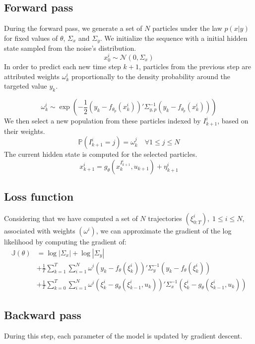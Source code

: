 \documentclass[10pt,a4paper]{article}
\begin{document}
\subsection{Forward pass}
During the forward pass, we generate a set of $N$ particles under the law $p(x|y)$ for fixed values of $\theta$, $\Sigma_x$ and $\Sigma_y$.
We initialize the sequence with a initial hidden state sampled from the noise's distribution.
$$
        x^i_0 \sim \mathcal{N}(0, \Sigma_x)
$$
In order to predict each new time step $k+1$, particles from the previous step are attributed weights $\omega_k^i$ proportionally to the density probability around the targeted value $y_k$.

$$\omega_k^i \sim \exp(-\frac{1}{2}(y_k - f_{\theta_p}(x_k^i))'\Sigma^{-1}_{y, p}(y_k - f_{\theta_p}(x_k^i)))$$
We then select a new population from these particles indexed by $I_{k+1}^i$, based on their weights.
$$\mathbb{P}(I_{k+1}^i=j) = \omega_k^j \quad \forall 1 \leq j \leq N$$
The current hidden state is computed for the selected particles.
$$x^i_{k+1} = g_\theta(x_k^{I_{k+1}^i}, u_{k+1}) + \eta^i_{k+1}$$

\subsection{Loss function}
Considering that we have computed a set of $N$ trajectories $(\xi^i_{0:T}),\;1 \leq i \leq N$, associated with weights $(\omega^i)$, we can approximate the gradient of the log likelihood by computing the gradient of:
\begin{align*}
        \mathbb{J}(\theta) & = \log |\Sigma_x| + \log |\Sigma_y|                                                                                                        \\
                           & + \frac{1}{T}\sum_{k=1}^T \sum_{i=1}^N \omega^i (y_k - f_\theta(\xi_k^i))' \Sigma_y^{-1} (y_k - f_\theta(\xi_k^i))                         \\
                           & + \frac{1}{T}\sum_{k=0}^T \sum_{i=1}^N \omega^i (\xi_k^i - g_\theta(\xi_{k-1}^i, u_k))'\Sigma_x^{-1}(\xi_k^i - g_\theta(\xi_{k-1}^i, u_k))
\end{align*}

\subsection{Backward pass}
During this step, each parameter of the model is updated by gradient descent.
\end{document}
